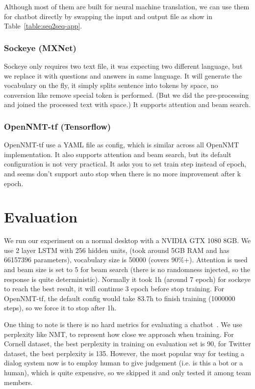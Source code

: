 \documentclass{article}
\begin{document}
Although most of them are built for neural machine translation, we can use them for chatbot directly by swapping the input
and output file as show in Table~\ref{table:seq2seq-app}.

\subsubsection{Sockeye (MXNet)}
\label{subsubsec:sockeye}

Sockeye only requires two text file, it was expecting two different language, but we replace it with questions and answers in same language.
It will generate the vocabulary on the fly, it simply splits sentence into tokens by space, no conversion like remove special token is performed.
(But we did the pre-processing and joined the processed text with space.) It supports attention and beam search.

\subsubsection{OpenNMT-tf (Tensorflow)}
\label{subsubsec:opennmt-tf}

OpenNMT-tf use a YAML file as config, which is similar across all OpenNMT implementation.
It also supports attention and beam search, but its default configuration is not very practical.
It asks you to set train step instead of epoch, and seems don't support auto stop when there is no more improvement after k epoch.

\section{Evaluation}
\label{sec:evaluation}

We run our experiment on a normal desktop with a NVIDIA GTX 1080 8GB.
We use 2 layer LSTM with 256 hidden units, (took around 5GB RAM and has 66157396 parameters), vocabulary size is 50000 (covers 90\%+).
Attention is used and beam size is set to 5 for beam search (there is no randomness injected, so the response is quite deterministic).
Normally it took 1h (around 7 epoch) for sockeye to reach the best result, it will continue 3 epoch before stop training.
For OpenNMT-tf, the default config would take 83.7h to finish training (1000000 steps), so we force it to stop after 1h.

One thing to note is there is no hard metrics for evaluating a chatbot~\cite{liu2016not}.
We use perplexity like NMT, to represent how close we approach when training.
For Cornell dataset, the best perplexity in training on evaluation set is 90, for Twitter dataset, the best perplexity is 135.
However, the most popular way for testing a dialog system now is to employ human to give judgement (i.e. is this a bot or a human),
which is quite expensive, so we skipped it and only tested it among team members.
\end{document}
